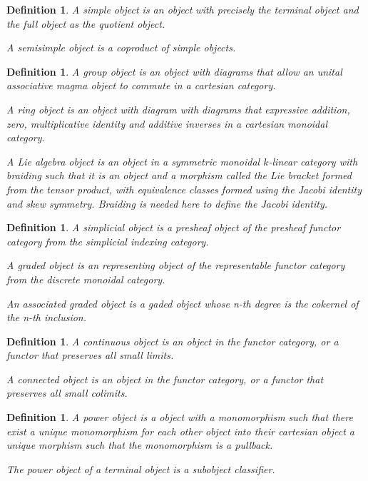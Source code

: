 \documentclass{tufte-book}
\newtheorem{definition}[theorem]{Definition}
\begin{document}
 \begin{definition}
     A simple object is an object with precisely the terminal object and the full object as the quotient object.
 
     A semisimple object is a coproduct of simple objects.
 \end{definition}
 
 \begin{definition}
     A group object is an object with diagrams that allow an unital associative magma object to commute in a cartesian category.
 
     A ring object is an object with diagram with diagrams that expressive addition, zero, multiplicative identity and additive inverses in a cartesian monoidal category.
 
     A Lie algebra object is an object in a symmetric monoidal $k$-linear category with braiding such that it is an object and a morphism called the Lie bracket formed from the tensor product, with equivalence classes formed using the Jacobi identity and skew symmetry. Braiding is needed here to define the Jacobi identity.
 \end{definition}
 
 \begin{definition}
     A simplicial object is a presheaf object of the presheaf functor category from the simplicial indexing category.
 
     A graded object is an representing object of the representable functor category from the discrete monoidal category.
 
     An associated graded object is a gaded object whose n-th degree is the cokernel of the n-th inclusion.
 \end{definition}
 
 \begin{definition}
     A continuous object is an object in the functor category, or a functor that preserves all small limits.
 
     A connected object is an object in the functor category, or a functor that preserves all small colimits.
 \end{definition}
 
 \begin{definition}
     A power object is a object with a monomorphism such that there exist a unique monomorphism for each other object into their cartesian object a unique morphism such that the monomorphism is a pullback.
 
     The power object of a terminal object is a subobject classifier.
 \end{definition}
 
\end{document}
